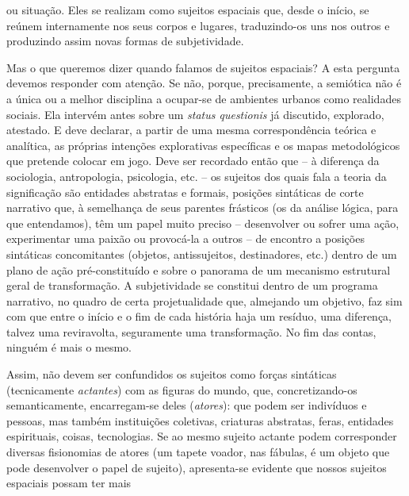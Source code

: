 \begin{multicols}{2}
ou situação.\allowbreak{} Eles se realizam como sujeitos espaciais que,\allowbreak{} desde o início,\allowbreak{} se reúnem internamente nos seus corpos e lugares,\allowbreak{} traduzindo-\allowbreak{}os uns nos outros e produzindo assim novas formas de subjetividade.\allowbreak{} \par{}Mas o que queremos dizer quando falamos de sujeitos espaciais? A esta pergunta devemos responder com atenção.\allowbreak{} Se não,\allowbreak{} porque,\allowbreak{} precisamente,\allowbreak{} a semiótica não é a única ou a melhor disciplina a ocupar-\allowbreak{}se de ambientes urbanos como realidades sociais.\allowbreak{} Ela intervém antes sobre um \textit{status questionis} já discutido,\allowbreak{} explorado,\allowbreak{} atestado.\allowbreak{} E deve declarar,\allowbreak{} a partir de uma mesma correspondência teórica e analítica,\allowbreak{} as próprias intenções explorativas específicas e os mapas metodológicos que pretende colocar em jogo.\allowbreak{} Deve ser recordado então que – à diferença da sociologia,\allowbreak{} antropologia,\allowbreak{} psicologia,\allowbreak{} etc.\allowbreak{} – os sujeitos dos quais fala a teoria da significação são entidades abstratas e formais,\allowbreak{} posições sintáticas de corte narrativo que,\allowbreak{} à semelhança de seus parentes frásticos (\allowbreak{}os da análise lógica,\allowbreak{} para que entendamos)\allowbreak{},\allowbreak{} têm um papel muito preciso – desenvolver ou sofrer uma ação,\allowbreak{} experimentar uma paixão ou provocá-\allowbreak{}la a outros – de encontro a posições sintáticas concomitantes (\allowbreak{}objetos,\allowbreak{} antissujeitos,\allowbreak{} destinadores,\allowbreak{} etc.\allowbreak{})\allowbreak{} dentro de um plano de ação pré-\allowbreak{}constituído e sobre o panorama de um mecanismo estrutural geral de transformação.\allowbreak{} A subjetividade se constitui dentro de um programa narrativo,\allowbreak{} no quadro de certa projetualidade que,\allowbreak{} almejando um objetivo,\allowbreak{} faz sim com que entre o início e o fim de cada história haja um resíduo,\allowbreak{} uma diferença,\allowbreak{} talvez uma reviravolta,\allowbreak{} seguramente uma transformação.\allowbreak{} No fim das contas,\allowbreak{} ninguém é mais o mesmo.\allowbreak{}\par{}Assim,\allowbreak{} não devem ser confundidos os sujeitos como forças sintáticas (\allowbreak{}tecnicamente \textit{actantes})\allowbreak{} com as figuras do mundo,\allowbreak{} que,\allowbreak{} concretizando-\allowbreak{}os semanticamente,\allowbreak{} encarregam-\allowbreak{}se deles (\allowbreak{}\textit{atores})\allowbreak{}:\allowbreak{} que podem ser indivíduos e pessoas,\allowbreak{} mas também instituições coletivas,\allowbreak{} criaturas abstratas,\allowbreak{} feras,\allowbreak{} entidades espirituais,\allowbreak{} coisas,\allowbreak{} tecnologias.\allowbreak{} Se ao mesmo sujeito actante podem corresponder diversas fisionomias de atores (\allowbreak{}um tapete voador,\allowbreak{} nas fábulas,\allowbreak{} é um objeto que pode desenvolver o papel de sujeito)\allowbreak{},\allowbreak{} apresenta-\allowbreak{}se evidente que nossos sujeitos espaciais possam ter mais 
\end{multicols}
